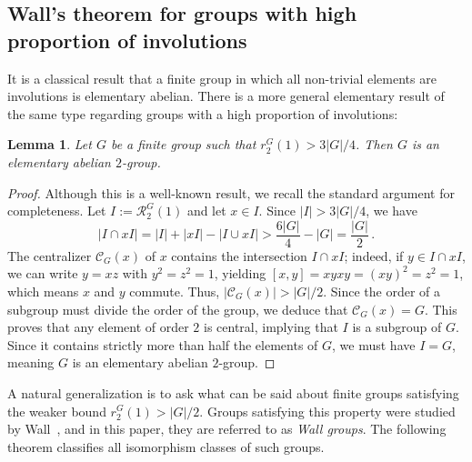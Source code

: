 \documentclass[12pt]{amsart}
\numberwithin{equation}{section}
\newtheorem{lem}[X]{Lemma}
\theoremstyle{definition}
\theoremstyle{remark}
\begin{document}
        
\subsection{Wall's theorem for groups with high proportion of involutions}
It is a classical result that a finite group in which all non-trivial elements are involutions is elementary abelian. There is a more general elementary result of the same type regarding groups with a high proportion of involutions:

\begin{lem}\label{3-4thinvolutions}
    Let $G$ be a finite group such that $r_2^G(1) > 3|G|/4$. Then $G$ is an elementary abelian $2$-group.
\end{lem}
\begin{proof}
    Although this is a well-known result, we recall the standard argument for completeness. Let $I := \mathcal{R}_2^G(1)$ and let $x \in I$. Since $|I| > 3|G|/4$, we have
    \[ |I \cap xI| = |I| + |xI| - |I \cup xI| > \frac{6|G|}{4} - |G| = \frac{|G|}{2}\, .\]
    The centralizer $\mathcal{C}_G(x)$ of $x$ contains the intersection $I \cap xI$; indeed, if $y \in I \cap xI$, we can write $y = xz$ with $y^2 = z^2 = 1$, yielding $[x,y] = xyxy = (xy)^2 = z^2 = 1$, which means $x$ and $y$ commute. Thus, $|\mathcal{C}_G(x)| > |G|/2$. Since the order of a subgroup must divide the order of the group, we deduce that $\mathcal{C}_G(x) = G$. This proves that any element of order $2$ is central, implying that $I$ is a subgroup of $G$. Since it contains strictly more than half the elements of $G$, we must have $I = G$, meaning $G$ is an elementary abelian $2$-group.
\end{proof}
A natural generalization is to ask what can be said about finite groups satisfying the weaker bound $r_2^G(1) > |G|/2$. Groups satisfying this property were studied by Wall~\cite{Wall}, and in this paper, they are referred to as \emph{Wall groups}. The following theorem classifies all isomorphism classes of such groups.
\end{document}
